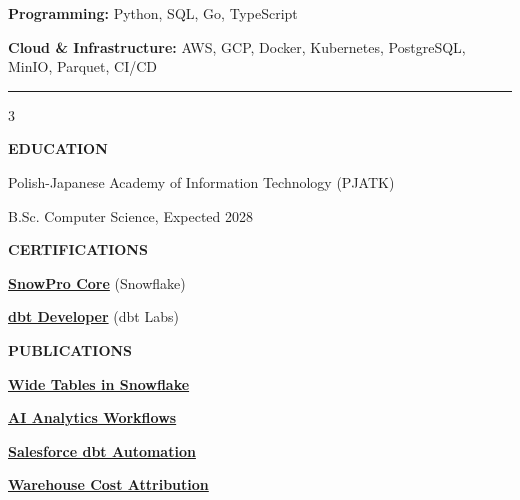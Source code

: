 \documentclass[11pt,a4paper]{article}
\begin{document}
\textbf{Programming:}
Python, SQL, Go, TypeScript

\textbf{Cloud \& Infrastructure:}
AWS, GCP, Docker, Kubernetes, PostgreSQL, MinIO, Parquet, CI/CD

\par\vspace{2pt}
\noindent\rule{\textwidth}{0.5pt}
\vspace{-4pt}

\begin{multicols}{3}

\textbf{EDUCATION}

Polish-Japanese Academy of Information Technology (PJATK)

B.Sc. Computer Science, Expected 2028

\columnbreak

\textbf{CERTIFICATIONS}

\href{https://achieve.snowflake.com/31ea4326-9e88-4148-a8b5-20326f786e50}
{\textbf{SnowPro Core}} (Snowflake)

\vspace{2pt}

\href{https://credentials.getdbt.com/75e67339-1260-4bb4-bb4e-efbb9c0bc774}
{\textbf{dbt Developer}} (dbt Labs)

\columnbreak

\textbf{PUBLICATIONS}

\href{https://medium.com/lortech-solutions-technical-blog/the-hidden-cost-of-wide-tables-in-snowflake-ab4757902c57}
{\textbf{Wide Tables in Snowflake}}

\href{https://medium.com/lortech-solutions-technical-blog/how-we-made-ai-analytics-work-smoothly-64c7adce93aa}
{\textbf{AI Analytics Workflows}}

\href{https://medium.com/lortech-solutions-technical-blog/automating-salesforce-dbt-models-dynamic-metadata-driven-modeling-df3fe2498da2}
{\textbf{Salesforce dbt Automation}}

\href{https://medium.com/lortech-solutions-technical-blog/no-idea-where-your-data-warehouse-spend-goes-7d600666993e}
{\textbf{Warehouse Cost Attribution}}

\end{multicols}
\end{document}
